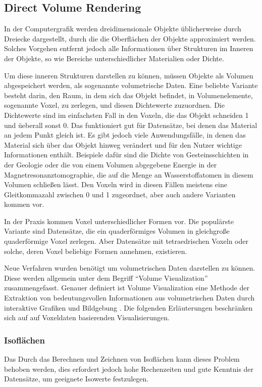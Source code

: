 \documentclass[a4paper,fontsize=12pt,toc=bib,halfparskip]{scrartcl}
\begin{document}
\subsection{Direct Volume Rendering}
In der Computergrafik werden dreidimensionale Objekte \"ublicherweise durch Dreiecke dargestellt, durch die die Oberfl\"achen der Objekte approximiert werden. Solches Vorgehen entfernt jedoch alle Informationen \"uber Strukturen im Inneren der Objekte, so wie Bereiche unterschiedlicher Materialien oder Dichte. 

Um diese inneren Strukturen darstellen zu k\"onnen, m\"ussen Objekte als Volumen abgespeichert werden, als sogenannte volumetrische Daten. Eine beliebte Variante besteht darin, den Raum, in dem sich das Objekt befindet, in Volumenelemente, sogenannte Voxel, zu zerlegen, und diesen Dichtewerte zuzuordnen. Die Dichtewerte sind im einfachsten Fall in den Voxeln, die das Objekt schneiden 1 und \"ueberall sonst 0. Das funktioniert gut f\"ur Datens\"atze, bei denen das Material an jedem Punkt gleich ist. Es gibt jedoch viele Anwendungsf\"alle, in denen das Material sich \"uber das Objekt hinweg ver\"andert und f\"ur den Nutzer wichtige Informationen enth\"alt. Beispiele daf\"ur sind die Dichte von Gesteinsschichten in der Geologie oder die von einem Volumen abgegebene Energie in der Magnetresonanztomographie, die auf die Menge an Wasserstoffatomen in diesem Volumen schließen l\"asst. Den Voxeln wird in diesen F\"allen meistens eine Gleitkommazahl zwischen 0 und 1 zugeordnet, aber auch andere Varianten kommen vor. 

In der Praxis kommen Voxel unterschiedlicher Formen vor. Die popul\"arste Variante sind Datens\"atze, die ein quaderf\"ormiges Volumen in gleichgro{\ss}e quaderf\"ormige Voxel zerlegen. Aber Datens\"atze mit tetraedrischen Voxeln oder solche, deren Voxel beliebige Formen annehmen, existieren.

Neue Verfahren wurden ben\"otigt um volumetrischen Daten darstellen zu k\"onnen. Diese werden allgemein unter dem Begriff ``Volume Visualization'' zusammengefasst. Genauer definiert ist Volume Visualization eine Methode der Extraktion von bedeutungsvollen Informationen aus volumetrischen Daten durch interaktive Grafiken und Bildgebung \cite[S.~127]{kaufman2005overview}. Die folgenden Erl\"auterungen beschr\"anken sich auf auf Voxeldaten basierenden Visualisierungen.

\subsubsection{Isofl\"achen}
Das Durch das Berechnen und Zeichnen von Isofl\"achen kann dieses Problem behoben werden, dies erfordert jedoch hohe Rechenzeiten und gute Kenntnis der Datens\"atze, um geeignete Isowerte festzulegen.
\end{document}
